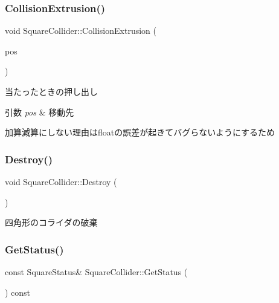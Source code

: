 \subsubsection{\texorpdfstring{Collision\+Extrusion()}{CollisionExtrusion()}}
{\footnotesize\ttfamily void Square\+Collider\+::\+Collision\+Extrusion (\begin{DoxyParamCaption}\item[{const \mbox{\hyperlink{common_8h_afb0c5e21d4133ff4f200992c0b534e1b}{V\+E\+C2}} \&}]{pos }\end{DoxyParamCaption})}



当たったときの押し出し 


\begin{DoxyParams}{引数}
{\em pos} & 移動先\\
\hline
\end{DoxyParams}
加算減算にしない理由はfloatの誤差が起きてバグらないようにするため \mbox{\label{class_square_collider_a83273e0e63692aa8020b8deedd456886}} 
\subsubsection{\texorpdfstring{Destroy()}{Destroy()}}
{\footnotesize\ttfamily void Square\+Collider\+::\+Destroy (\begin{DoxyParamCaption}{ }\end{DoxyParamCaption})}



四角形のコライダの破棄 

\mbox{\label{class_square_collider_ac437bc1bed951c82ca25d2b17a7b2e0f}} 
\subsubsection{\texorpdfstring{Get\+Status()}{GetStatus()}}
{\footnotesize\ttfamily const Square\+Status\& Square\+Collider\+::\+Get\+Status (\begin{DoxyParamCaption}{ }\end{DoxyParamCaption}) const\hspace{0.3cm}{\ttfamily [inline]}}



